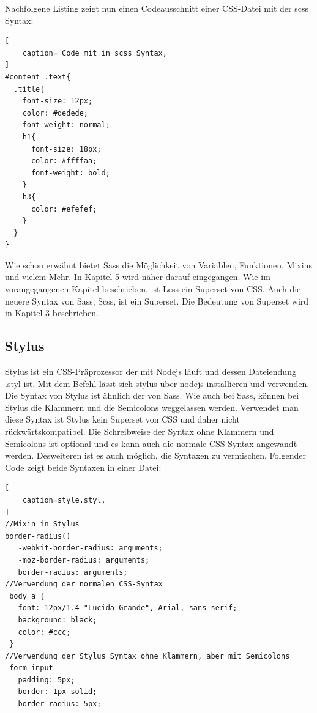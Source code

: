 Nachfolgene Listing zeigt nun einen Codeausschnitt einer CSS-Datei mit der scss Syntax:
\begin{lstlisting}[
	caption= Code mit in scss Syntax,
]
#content .text{
  .title{
    font-size: 12px;
    color: #dedede;
    font-weight: normal;
    h1{
      font-size: 18px;
      color: #ffffaa;
      font-weight: bold;
    }
    h3{
      color: #efefef;
    }
  }
}
\end{lstlisting}

Wie schon erwähnt bietet Sass die Möglichkeit von Variablen, Funktionen, Mixins und vielem Mehr.
In Kapitel 5 wird näher darauf eingegangen. Wie im vorangegangenen Kapitel beschrieben, ist Less ein Superset von CSS. Auch die neuere Syntax von Sass, Scss, ist ein Superset. Die Bedeutung von Superset wird in Kapitel 3 beschrieben.
\newpage
\subsection{Stylus}
Stylus ist ein CSS-Präprozessor der mit Nodejs läuft und dessen Dateiendung .styl ist.\newline
Mit dem Befehl \glqq{} lässt sich stylus über nodejs installieren und verwenden. \newline
Die Syntax von Stylus ist ähnlich der von Sass. Wie auch bei Sass, können bei Stylus die Klammern und die Semicolons weggelassen werden.
Verwendet man diese Syntax ist Stylus kein Superset von CSS und daher nicht rückwärtskompatibel.\newline
Die Schreibweise der Syntax ohne Klammern und Semicolons ist optional und es kann auch die normale CSS-Syntax angewandt werden.\newline
Desweiteren ist es auch möglich, die Syntaxen zu vermischen. Folgender Code zeigt beide Syntaxen in einer Datei:
\begin{lstlisting}[
	caption=style.styl,
]
//Mixin in Stylus
border-radius()
   -webkit-border-radius: arguments;
   -moz-border-radius: arguments;
   border-radius: arguments;
//Verwendung der normalen CSS-Syntax
 body a {
   font: 12px/1.4 "Lucida Grande", Arial, sans-serif;
   background: black;
   color: #ccc;
 }
//Verwendung der Stylus Syntax ohne Klammern, aber mit Semicolons
 form input
   padding: 5px;
   border: 1px solid;
   border-radius: 5px;
\end{lstlisting}
\autocite[]{LearnBoost.2010}\newline

